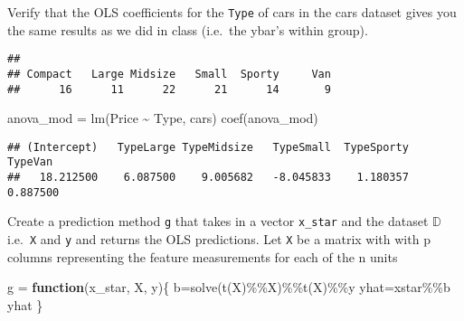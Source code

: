 \documentclass[
]{article}
\newenvironment{Shaded}{\begin{snugshade}}{\end{snugshade}}
\newcommand{\ControlFlowTok}[1]{\textcolor[rgb]{0.13,0.29,0.53}{\textbf{#1}}}
\newcommand{\FunctionTok}[1]{\textcolor[rgb]{0.00,0.00,0.00}{#1}}
\newcommand{\NormalTok}[1]{#1}
\newcommand{\OtherTok}[1]{\textcolor[rgb]{0.56,0.35,0.01}{#1}}
\newcommand{\SpecialCharTok}[1]{\textcolor[rgb]{0.00,0.00,0.00}{#1}}
\begin{document}
Verify that the OLS coefficients for the \texttt{Type} of cars in the
cars dataset gives you the same results as we did in class (i.e.~the
ybar's within group).

\begin{Shaded}
\end{Shaded}

\begin{verbatim}
## 
## Compact   Large Midsize   Small  Sporty     Van 
##      16      11      22      21      14       9
\end{verbatim}

\begin{Shaded}
\begin{Highlighting}[]
\NormalTok{anova\_mod }\OtherTok{=} \FunctionTok{lm}\NormalTok{(Price }\SpecialCharTok{\textasciitilde{}}\NormalTok{ Type, cars)}
\FunctionTok{coef}\NormalTok{(anova\_mod)}
\end{Highlighting}
\end{Shaded}

\begin{verbatim}
## (Intercept)   TypeLarge TypeMidsize   TypeSmall  TypeSporty     TypeVan 
##   18.212500    6.087500    9.005682   -8.045833    1.180357    0.887500
\end{verbatim}

Create a prediction method \texttt{g} that takes in a vector
\texttt{x\_star} and the dataset \(\mathbb{D}\) i.e.~\texttt{X} and
\texttt{y} and returns the OLS predictions. Let \texttt{X} be a matrix
with with p columns representing the feature measurements for each of
the n units

\begin{Shaded}
\begin{Highlighting}[]
\NormalTok{g }\OtherTok{=} \ControlFlowTok{function}\NormalTok{(x\_star, X, y)\{}
\NormalTok{  b}\OtherTok{=}\FunctionTok{solve}\NormalTok{(}\FunctionTok{t}\NormalTok{(X)}\SpecialCharTok{\%\%}\NormalTok{X)}\SpecialCharTok{\%\%}\FunctionTok{t}\NormalTok{(X)}\SpecialCharTok{\%\%}\NormalTok{y}
\NormalTok{  yhat}\OtherTok{=}\NormalTok{xstar}\SpecialCharTok{\%\%}\NormalTok{b}
\NormalTok{  yhat}
\NormalTok{\}}
\end{Highlighting}
\end{Shaded}
\end{document}
